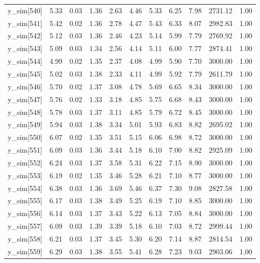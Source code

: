 \begin{table}[ht]
\begin{tabular}{rrrrrrrrrrr}
  y\_sim[540] & 5.33 & 0.03 & 1.36 & 2.63 & 4.46 & 5.33 & 6.25 & 7.98 & 2731.12 & 1.00 \\ 
  y\_sim[541] & 5.42 & 0.02 & 1.36 & 2.78 & 4.47 & 5.43 & 6.33 & 8.07 & 2982.83 & 1.00 \\ 
  y\_sim[542] & 5.12 & 0.03 & 1.36 & 2.46 & 4.23 & 5.14 & 5.99 & 7.79 & 2769.92 & 1.00 \\ 
  y\_sim[543] & 5.09 & 0.03 & 1.34 & 2.56 & 4.14 & 5.11 & 6.00 & 7.77 & 2874.41 & 1.00 \\ 
  y\_sim[544] & 4.99 & 0.02 & 1.35 & 2.37 & 4.08 & 4.99 & 5.90 & 7.70 & 3000.00 & 1.00 \\ 
  y\_sim[545] & 5.02 & 0.03 & 1.38 & 2.33 & 4.11 & 4.99 & 5.92 & 7.79 & 2611.79 & 1.00 \\ 
  y\_sim[546] & 5.70 & 0.02 & 1.37 & 3.08 & 4.78 & 5.69 & 6.65 & 8.34 & 3000.00 & 1.00 \\ 
  y\_sim[547] & 5.76 & 0.02 & 1.33 & 3.18 & 4.85 & 5.75 & 6.68 & 8.43 & 3000.00 & 1.00 \\ 
  y\_sim[548] & 5.78 & 0.03 & 1.37 & 3.11 & 4.85 & 5.79 & 6.72 & 8.45 & 3000.00 & 1.00 \\ 
  y\_sim[549] & 5.94 & 0.03 & 1.38 & 3.34 & 5.01 & 5.93 & 6.83 & 8.82 & 2695.02 & 1.00 \\ 
  y\_sim[550] & 6.07 & 0.02 & 1.35 & 3.51 & 5.15 & 6.06 & 6.98 & 8.72 & 3000.00 & 1.00 \\ 
  y\_sim[551] & 6.09 & 0.03 & 1.36 & 3.44 & 5.18 & 6.10 & 7.00 & 8.82 & 2925.09 & 1.00 \\ 
  y\_sim[552] & 6.24 & 0.03 & 1.37 & 3.58 & 5.31 & 6.22 & 7.15 & 8.90 & 3000.00 & 1.00 \\ 
  y\_sim[553] & 6.19 & 0.02 & 1.35 & 3.46 & 5.28 & 6.21 & 7.10 & 8.77 & 3000.00 & 1.00 \\ 
  y\_sim[554] & 6.38 & 0.03 & 1.36 & 3.69 & 5.46 & 6.37 & 7.30 & 9.08 & 2827.58 & 1.00 \\ 
  y\_sim[555] & 6.17 & 0.03 & 1.38 & 3.49 & 5.25 & 6.19 & 7.10 & 8.85 & 3000.00 & 1.00 \\ 
  y\_sim[556] & 6.14 & 0.03 & 1.37 & 3.43 & 5.22 & 6.13 & 7.05 & 8.84 & 3000.00 & 1.00 \\ 
  y\_sim[557] & 6.09 & 0.03 & 1.39 & 3.39 & 5.18 & 6.10 & 7.03 & 8.72 & 2999.44 & 1.00 \\ 
  y\_sim[558] & 6.21 & 0.03 & 1.37 & 3.45 & 5.30 & 6.20 & 7.14 & 8.87 & 2814.54 & 1.00 \\ 
  y\_sim[559] & 6.29 & 0.03 & 1.38 & 3.55 & 5.41 & 6.28 & 7.23 & 9.03 & 2903.06 & 1.00 \\ 

\end{tabular}
\end{table}

